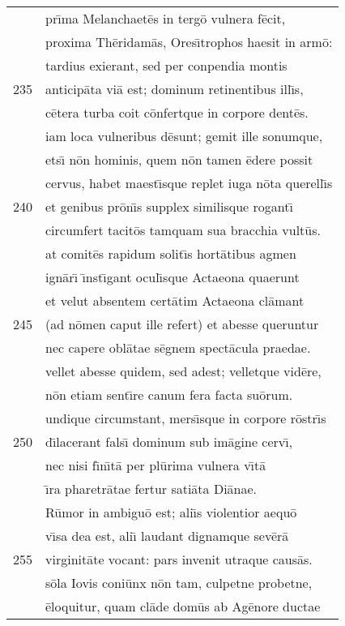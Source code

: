 \documentclass[paper=6in:9in,pagesize=pdftex,
               headinclude=on,footinclude=on,12pt]{scrbook}
\begin{document}
\begin{longtable}[p]{ r l }
 & pr\={\i}ma Melanchaet\=es in terg\=o vulnera f\=ecit,\\ 
 & proxima Th\=eridam\=as, Ores\={\i}trophos haesit in arm\=o:\\ 
 & tardius exierant, sed per conpendia montis\\ 
235 & anticip\=ata vi\=a est; dominum retinentibus ill\={\i}s,\\ 
 & c\=etera turba coit c\=onfertque in corpore dent\=es.\\ 
 & iam loca vulneribus d\=esunt; gemit ille sonumque,\\ 
 & ets\={\i} n\=on hominis, quem n\=on tamen \=edere possit\\ 
 & cervus, habet maest\={\i}sque replet iuga n\=ota querell\={\i}s\\ 
240 & et genibus pr\=on\={\i}s supplex similisque rogant\={\i}\\ 
 & circumfert tacit\=os tamquam sua bracchia vult\=us.\\ 
 & at comit\=es rapidum solit\={\i}s hort\=atibus agmen\\ 
 & ign\=ar\={\i} \={\i}nst\={\i}gant ocul\={\i}sque Actaeona quaerunt\\ 
 & et velut absentem cert\=atim Actaeona cl\=amant\\ 
245 & (ad n\=omen caput ille refert) et abesse queruntur\\ 
 & nec capere obl\=atae s\=egnem spect\=acula praedae.\\ 
 & vellet abesse quidem, sed adest; velletque vid\=ere,\\ 
 & n\=on etiam sent\={\i}re canum fera facta su\=orum.\\ 
 & undique circumstant, mers\={\i}sque in corpore r\=ostr\={\i}s\\ 
250 & d\={\i}lacerant fals\={\i} dominum sub im\=agine cerv\={\i},\\ 
 & nec nisi f\={\i}n\={\i}t\=a per pl\=urima vulnera v\={\i}t\=a\\ 
 & \={\i}ra pharetr\=atae fertur sati\=ata Di\=anae.\\ 
 & \indent R\=umor in ambigu\=o est; ali\={\i}s violentior aequ\=o\\ 
 & v\={\i}sa dea est, ali\={\i} laudant dignamque sev\=er\=a\\ 
255 & virginit\=ate vocant: pars invenit utraque caus\=as.\\ 
 & s\=ola Iovis coni\=unx n\=on tam, culpetne probetne,\\ 
 & \=eloquitur, quam cl\=ade dom\=us ab Ag\=enore ductae\\ 

\end{longtable}
\end{document}
